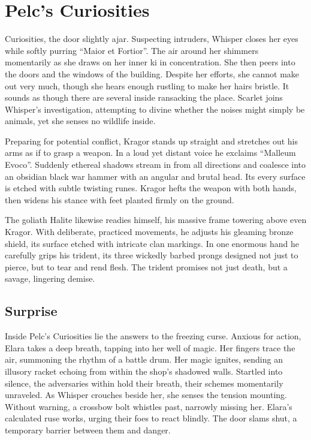 \documentclass[
  letterpaper,12pt,twoside,twocolumn,openany,
  nodeprecatedcode,bg=full]{dndbook}
\begin{document}
\chapter{Pelc's Curiosities}\label{pelcs-curiosities}

 Curiosities, the door
slightly ajar. Suspecting intruders, Whisper closes her eyes while
softly purring ``Maior et Fortior''. The air around her shimmers
momentarily as she draws on her inner ki in concentration. She then
peers into the doors and the windows of the building. Despite her
efforts, she cannot make out very much, though she hears enough rustling
to make her hairs bristle. It sounds as though there are several inside
ransacking the place. Scarlet joins Whisper's investigation, attempting
to divine whether the noises might simply be animals, yet she senses no
wildlife inside.

Preparing for potential conflict, Kragor stands up straight and
stretches out his arms as if to grasp a weapon. In a loud yet distant
voice he exclaims ``Malleum Evoco''. Suddenly ethereal shadows stream in
from all directions and coalesce into an obsidian black war hammer with
an angular and brutal head. Its every surface is etched with subtle
twisting runes. Kragor hefts the weapon with both hands, then widens his
stance with feet planted firmly on the ground.

The goliath Halite likewise readies himself, his massive frame towering
above even Kragor. With deliberate, practiced movements, he adjusts his
gleaming bronze shield, its surface etched with intricate clan markings.
In one enormous hand he carefully grips his trident, its three wickedly
barbed prongs designed not just to pierce, but to tear and rend flesh.
The trident promises not just death, but a savage, lingering demise.

\section{Surprise}\label{surprise}

Inside Pelc's Curiosities lie the answers to the freezing curse. Anxious
for action, Elara takes a deep breath, tapping into her well of magic.
Her fingers trace the air, summoning the rhythm of a battle drum. Her
magic ignites, sending an illusory racket echoing from within the shop's
shadowed walls. Startled into silence, the adversaries within hold their
breath, their schemes momentarily unraveled. As Whisper crouches beside
her, she senses the tension mounting. Without warning, a crossbow bolt
whistles past, narrowly missing her. Elara's calculated ruse works,
urging their foes to react blindly. The door slams shut, a temporary
barrier between them and danger.
\end{document}
